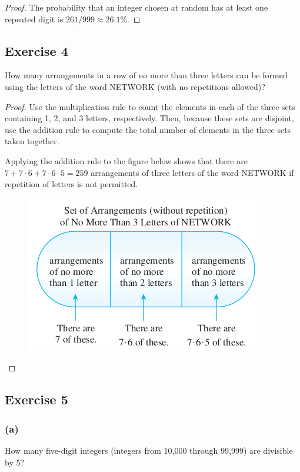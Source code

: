 \documentclass[14pt]{extarticle}
\begin{document}
\begin{proof}
     The probability that an integer chosen at random has at least one repeated digit is \(261/999 \approx 26.1\%\).
\end{proof}

\subsection{Exercise 4}
How many arrangements in a row of no more than three letters can be formed using the letters of the word NETWORK
(with no repetitions allowed)?

\begin{proof}
     Use the multiplication rule to count the elements in each of the three sets containing 1, 2, and 3 letters, respectively.
     Then, because these sets are disjoint, use the addition rule to compute the total number of elements in the three sets
     taken together.

     Applying the addition rule to the figure below shows that there are \(7 + 7 \cdot 6 + 7 \cdot 6 \cdot 5 = 259\)
     arrangements of three letters of the word NETWORK if repetition of letters is not permitted.

     \begin{figure}[ht!]
          \centering
          \includegraphics[scale=0.5]{../images/9.3.4.png}
     \end{figure}
\end{proof}

\subsection{Exercise 5}
\subsubsection{(a)}
How many five-digit integers (integers from 10,000 through 99,999) are divisible by 5?
\end{document}
